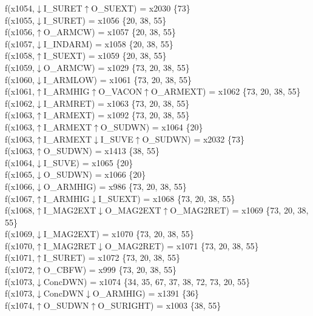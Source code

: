 f(x1054,$\downarrow$I\_SURET$\uparrow$O\_SUEXT) = x2030 \{73\} \\  
f(x1055,$\downarrow$I\_SURET) = x1056 \{20, 38, 55\} \\  
f(x1056,$\uparrow$O\_ARMCW) = x1057 \{20, 38, 55\} \\  
f(x1057,$\downarrow$I\_INDARM) = x1058 \{20, 38, 55\} \\  
f(x1058,$\uparrow$I\_SUEXT) = x1059 \{20, 38, 55\} \\  
f(x1059,$\downarrow$O\_ARMCW) = x1029 \{73, 20, 38, 55\} \\  
f(x1060,$\downarrow$I\_ARMLOW) = x1061 \{73, 20, 38, 55\} \\  
f(x1061,$\uparrow$I\_ARMHIG$\uparrow$O\_VACON$\uparrow$O\_ARMEXT) = x1062 \{73, 20, 38, 55\} \\  
f(x1062,$\downarrow$I\_ARMRET) = x1063 \{73, 20, 38, 55\} \\  
f(x1063,$\uparrow$I\_ARMEXT) = x1092 \{73, 20, 38, 55\} \\  
f(x1063,$\uparrow$I\_ARMEXT$\uparrow$O\_SUDWN) = x1064 \{20\} \\  
f(x1063,$\uparrow$I\_ARMEXT$\downarrow$I\_SUVE$\uparrow$O\_SUDWN) = x2032 \{73\} \\  
f(x1063,$\uparrow$O\_SUDWN) = x1413 \{38, 55\} \\  
f(x1064,$\downarrow$I\_SUVE) = x1065 \{20\} \\  
f(x1065,$\downarrow$O\_SUDWN) = x1066 \{20\} \\  
f(x1066,$\downarrow$O\_ARMHIG) = x986 \{73, 20, 38, 55\} \\  
f(x1067,$\uparrow$I\_ARMHIG$\downarrow$I\_SUEXT) = x1068 \{73, 20, 38, 55\} \\  
f(x1068,$\uparrow$I\_MAG2EXT$\downarrow$O\_MAG2EXT$\uparrow$O\_MAG2RET) = x1069 \{73, 20, 38, 55\} \\  
f(x1069,$\downarrow$I\_MAG2EXT) = x1070 \{73, 20, 38, 55\} \\  
f(x1070,$\uparrow$I\_MAG2RET$\downarrow$O\_MAG2RET) = x1071 \{73, 20, 38, 55\} \\  
f(x1071,$\uparrow$I\_SURET) = x1072 \{73, 20, 38, 55\} \\  
f(x1072,$\uparrow$O\_CBFW) = x999 \{73, 20, 38, 55\} \\  
f(x1073,$\downarrow$ConcDWN) = x1074 \{34, 35, 67, 37, 38, 72, 73, 20, 55\} \\  
f(x1073,$\downarrow$ConcDWN$\downarrow$O\_ARMHIG) = x1391 \{36\} \\  
f(x1074,$\uparrow$O\_SUDWN$\uparrow$O\_SURIGHT) = x1003 \{38, 55\} \\  
